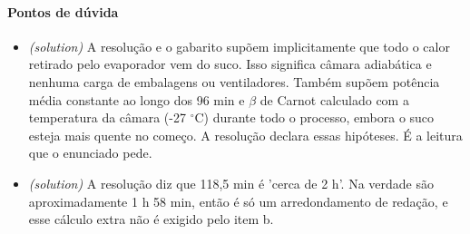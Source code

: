 \documentclass{article}%
\begin{document}
\paragraph{Pontos de dúvida}%
\begin{itemize}%
\item%
\textit{(solution)} A resolução e o gabarito supõem implicitamente que todo o calor retirado pelo evaporador vem do suco. Isso significa câmara adiabática e nenhuma carga de embalagens ou ventiladores. Também supõem potência média constante ao longo dos 96 min e $\beta$ de Carnot calculado com a temperatura da câmara (-27 $^\circ$C) durante todo o processo, embora o suco esteja mais quente no começo. A resolução declara essas hipóteses. É a leitura que o enunciado pede.%
\item%
\textit{(solution)} A resolução diz que 118,5 min é 'cerca de 2 h'. Na verdade são aproximadamente 1 h 58 min, então é só um arredondamento de redação, e esse cálculo extra não é exigido pelo item b.%
\end{itemize}%
\end{document}
